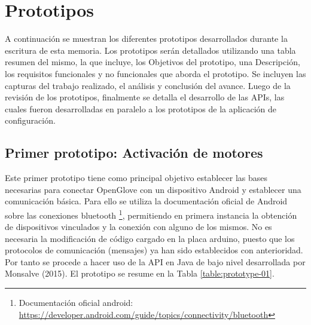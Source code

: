 \section{Prototipos}
\label{seccion-prototipos}
A continuación se muestran los diferentes prototipos desarrollados durante la escritura de esta memoria. Los prototipos serán detallados utilizando una tabla resumen del mismo, la que incluye, los Objetivos del prototipo, una Descripción, los requisitos funcionales y no funcionales que aborda el prototipo.  Se incluyen las capturas del trabajo realizado, el análisis y conclusión del avance. Luego de la revisión de los prototipos, finalmente se detalla el desarrollo de las APIs, las cuales fueron desarrolladas en paralelo a los prototipos de la aplicación de configuración.


\subsection{Primer prototipo:  Activación de motores}
\label{primer-prototipo}
Este primer prototipo tiene como principal objetivo establecer las bases necesarias para conectar OpenGlove con un dispositivo Android y establecer una comunicación básica. Para ello se utiliza la documentación oficial de Android sobre las conexiones bluetooth \footnote{Documentación oficial android: \url{https://developer.android.com/guide/topics/connectivity/bluetooth}}, permitiendo en primera instancia la obtención de dispositivos vinculados y la conexión con alguno de los mismos. No es necesaria la modificación de código cargado en la placa arduino, puesto que los protocolos de comunicación (mensajes) ya han sido establecidos con anterioridad. Por tanto se procede a hacer uso de la API en Java de bajo nivel desarrollada por Monsalve (2015). El prototipo se resume en la Tabla \ref{table:prototype-01}.


